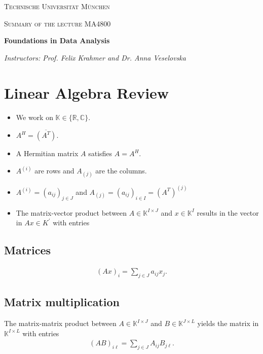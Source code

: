 \documentclass[a4paper, english, headtopline=0.08em, headsepline=0.04em, left = 1cm, right = 1cm, DIV=15]{article}
\begin{document}
{
    \begin{titlepage}
    	\centering
    	\vfill
    	{\scshape\LARGE Technische Universität München \par}
    	\vfill
    	{\scshape\Large Summary of the lecture MA4800\\   \par}
    	{\huge\bfseries Foundations in Data Analysis \par}
    	\vfill
    	{\Large\itshape Instructors: Prof. Felix Krahmer and Dr. Anna Veselovska \par}
    	\vfill
    \end{titlepage}
}

\tableofcontents
\clearpage 

\section{Linear Algebra Review}


\begin{itemize}
	\item We work on $\mathbb{K} \in\{\mathbb{R}, \mathbb{C}\}$.
	\item $A^H = \overline{(A^T)}$.
	\item A Hermitian matrix $A$ satisfies $A=A^H$.
	\item $A^{(i)}$ are rows and $A_{(j)}$ are the columns.
	\item $A^{(i)}=\left(a_{i j}\right)_{j \in J}$ 
	and $A_{(j)}=\left(a_{i j}\right)_{i \in I}=\left(A^{T}\right)^{(j)}$
	\item The matrix-vector product between 
	$A \in \mathbb{K}^{I \times J}$ and $x \in \mathbb{K}^{I}$ results in the vector in $A x \in K^{\prime}$ with entries
\end{itemize}

\subsection{Matrices}

\begin{align*}
	(A x)_{i}=\sum_{j \in J} a_{i j} x_{j} .
\end{align*}
\subsection{Matrix multiplication}
The matrix-matrix product between $A \in \mathbb{K}^{I\times J}$ and $B \in \mathbb{K}^{J \times L}$ yields the matrix in $\mathbb{K}^{I \times L}$ with entries
\begin{align*}
	(A B)_{i \ell}=\sum_{j \in J} A_{i j} B_{j \ell} .
\end{align*}
\end{document}
